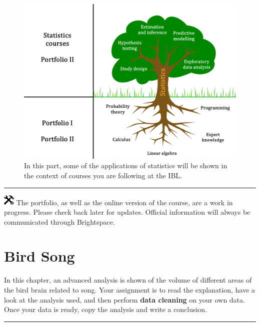 \documentclass[
]{book}
\begin{document}
\begin{figure}
\includegraphics[width=1\linewidth]{figures/learninggoalstreeroots} \caption{In this part, some of the applications of statistics will be shown in the context of courses you are following at the IBL.}\label{fig:learninggoals}
\end{figure}

\begin{center}\rule{0.5\linewidth}{0.5pt}\end{center}

\includegraphics[width=0.20833in,height=0.20833in]{figures/underconstruction.png} The portfolio, as well as the online version of the course, are a work in progress. Please check back later for updates. Official information will always be communicated through Brightspace.

\hypertarget{bird-song}{%
\chapter{Bird Song}\label{bird-song}}

In this chapter, an advanced analysis is shown of the volume of different areas of the bird brain related to song. Your assignment is to read the explanation, have a look at the analysis used, and then perform \textbf{data cleaning} on your own data. Once your data is ready, copy the analysis and write a conclusion.

\begin{center}\rule{0.5\linewidth}{0.5pt}\end{center}
\end{document}
